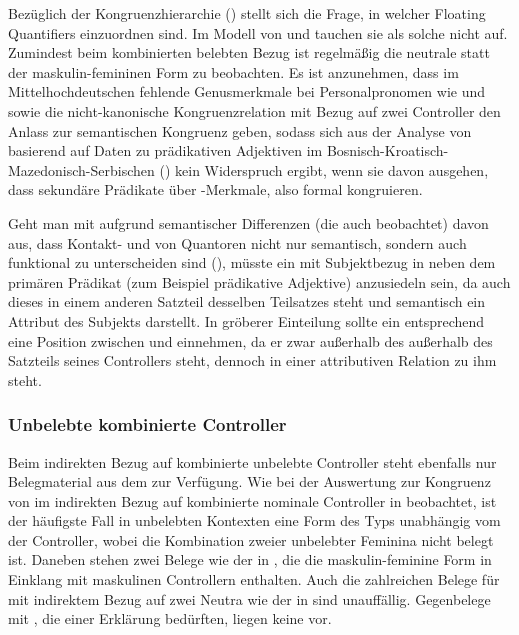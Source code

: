 Bezüglich der Kongruenzhierarchie
() stellt sich die Frage, in welcher 
Floating Quantifiers einzuordnen sind. Im Modell von
\citet{corbett1979} und \citet[84]{wechslerzlatic2003} tauchen sie als solche
nicht auf. Zumindest beim kombinierten belebten Bezug ist regelmäßig die
neutrale statt der maskulin-\allowbreak{}femi\-ninen Form zu beobachten. Es ist
anzunehmen, dass im Mittelhochdeutschen fehlende
Genusmerkmale bei Personalpronomen wie  und
 sowie die nicht-kanonische Kongruenzrelation mit Bezug auf zwei
Controller den Anlass zur semantischen Kongruenz geben, sodass sich aus der
Analyse von \citet[54--55, 84]{wechslerzlatic2003} basierend auf Daten zu
prädikativen Adjektiven im
Bosnisch-\allowbreak{}Kroatisch-\allowbreak{}Mazedonisch-\allowbreak{}Serbischen
() kein Widerspruch ergibt, wenn sie davon ausgehen, dass sekundäre
Prädikate über -Merkmale, also formal kongruieren.

Geht man mit \citet{spector2009} aufgrund semantischer Differenzen (die auch
\cite{pittner1995} beobachtet) davon aus, dass Kontakt- und
 von Quantoren nicht nur semantisch, sondern auch
funktional zu unterscheiden sind (), müsste ein
 mit Subjektbezug in  neben
dem primären Prädikat (zum Beispiel prädikative
Adjektive) anzusiedeln sein, da auch dieses in einem
anderen Satzteil desselben Teilsatzes steht und semantisch ein
Attribut des Subjekts darstellt. In
 gröberer Einteilung sollte ein
 entsprechend eine Position zwischen
 und  einnehmen, da er zwar außerhalb des
außerhalb des Satzteils seines Controllers steht, dennoch in einer
attributiven Relation zu ihm steht.


\subsubsection{Unbelebte kombinierte Controller}

Beim indirekten Bezug auf kombinierte unbelebte Controller steht ebenfalls nur
Belegmaterial aus dem \CAO{} zur Verfügung. Wie bei der Auswertung zur
Kongruenz von  im indirekten Bezug auf kombinierte nominale
Controller in  beobachtet, ist der
häufigste Fall in unbelebten Kontexten eine Form des Typs 
unabhängig vom  der Controller, wobei die Kombination zweier
unbelebter Feminina nicht belegt ist. Daneben stehen zwei Belege wie der in
, die die maskulin-feminine Form  in Einklang
mit maskulinen Controllern enthalten. Auch die zahlreichen Belege für
 mit indirektem Bezug auf zwei Neutra wie der in 
sind unauffällig. Gegenbelege mit , die einer Erklärung bedürften,
liegen keine vor.


